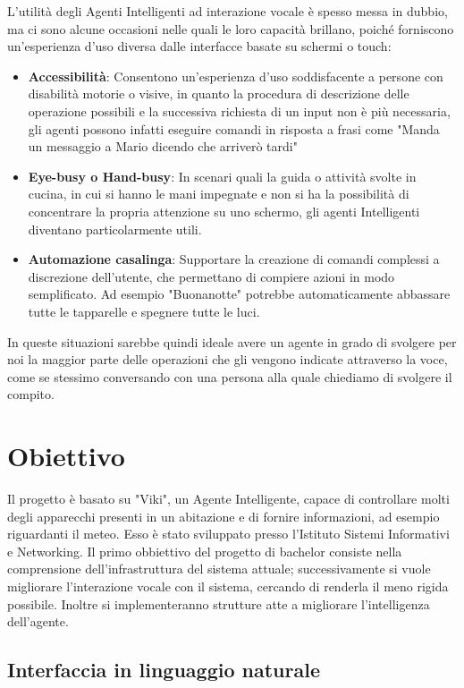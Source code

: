 \documentclass[twoside]{supsistudent}
\begin{document}
L'utilità degli Agenti Intelligenti ad interazione vocale è spesso messa in dubbio, ma ci sono alcune occasioni nelle quali le loro capacità brillano, poiché forniscono un'esperienza d'uso diversa dalle interfacce basate su schermi o touch:
\begin{itemize}
	\item \textbf{Accessibilità}: Consentono un'esperienza d'uso soddisfacente a persone con disabilità motorie o visive, in quanto la procedura di descrizione delle operazione possibili e la successiva richiesta di un input non è più necessaria, gli agenti possono infatti eseguire comandi in risposta a frasi come "Manda un messaggio a Mario dicendo che arriverò tardi"
	\item \textbf{Eye-busy o Hand-busy}: In scenari quali la guida o attività svolte in cucina, in cui si hanno le mani impegnate e non si ha la possibilità di concentrare la propria attenzione su uno schermo, gli agenti Intelligenti diventano particolarmente utili.
	\item \textbf{Automazione casalinga}: Supportare la creazione di comandi complessi a discrezione dell'utente, che permettano di compiere azioni in modo semplificato. Ad esempio "Buonanotte" potrebbe automaticamente abbassare tutte le tapparelle e spegnere tutte le luci.
\end{itemize}
In queste situazioni sarebbe quindi ideale avere un agente in grado di svolgere per noi la maggior parte delle operazioni che gli vengono indicate attraverso la voce, come se stessimo conversando con una persona alla quale chiediamo di svolgere il compito.

\chapter{Obiettivo}

Il progetto è basato su "Viki", un Agente Intelligente, capace di controllare molti degli apparecchi presenti in un abitazione e di fornire informazioni, ad esempio riguardanti il meteo.\cite{agenteinteligente}
Esso è stato sviluppato presso l'Istituto Sistemi Informativi e Networking. \cite{ISIN}
Il primo obbiettivo del progetto di bachelor consiste nella comprensione dell'infrastruttura del sistema attuale; successivamente si  vuole migliorare l'interazione vocale con il sistema, cercando di renderla il meno rigida possibile. Inoltre si implementeranno strutture atte a migliorare l'intelligenza dell'agente.

\section{Interfaccia in linguaggio naturale}
\end{document}
